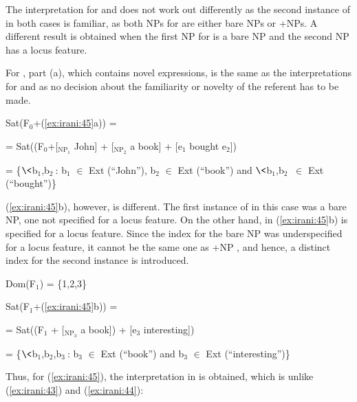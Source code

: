 \documentclass[output=paper,
modfonts
]{langscibook}
\begin{document}
The interpretation for  and  does not work out differently as the second instance of  in both cases is familiar, as both NPs for  are either bare NPs or +NPs. A different result is obtained when the first NP for  is a bare NP and the second NP has a locus feature. 

For , part (a), which contains novel expressions, is the same as the interpretations for  and  as no decision about the familiarity or novelty of the referent has to be made. 

\begin{exe}

\ex Sat(F$_0$+(\ref{ex:irani:45}a)) = \par 
= Sat((F$_0$+[$_{\text{NP}_{1}}$ John] + [$_{\text{NP}_{2}}$ a book] + [e$_1$ bought e$_2$])\par 
= \{$\<$b$_1$,b$_2\>$: b$_1$ \(\in\) Ext (``John''), b$_2$ \(\in\) Ext (``book'') and $\<$b$_1$,b$_2\>$ \(\in\) Ext (``bought'')\} \par 

\end{exe} 

(\ref{ex:irani:45}b), however, is different. The first instance of  in this case was a bare NP, one not specified for a locus feature. On the other hand,  in (\ref{ex:irani:45}b) is specified for a locus feature. Since the index for the bare NP  was underspecified for a locus feature, it cannot be the same one as +NP , and hence, a distinct index for the second instance is introduced. 

\begin{exe}

\ex Dom(F$_1$) = \{1,2,3\}\par 

Sat(F$_1$+(\ref{ex:irani:45}b)) = \par 
= Sat((F$_1$ + [$_{\text{NP}_{3}}$ a book]) + [e$_3$ interesting]) \par 
= \{$\<$b$_1$,b$_2$,b$_3\>$: b$_3$ \(\in\) Ext (``book'') and b$_3$ \(\in\) Ext (``interesting'')\} \par 

\end{exe}

Thus, for (\ref{ex:irani:45}), the interpretation in  is obtained, which is unlike (\ref{ex:irani:43}) and (\ref{ex:irani:44}): 
\end{document}
